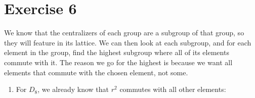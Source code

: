 \documentclass{article}
\begin{document}
    \section*{Exercise 6}
    We know that the centralizers of each group are a subgroup
    of that group,
    so they will feature in its lattice.
    We can then look at each subgroup, and for each element
    in the group, find the highest subgroup where all
    of its elements commute with it.
    The reason we go for the highest is because
    we want all elements that commute with the chosen element, not some.
    \begin{enumerate}[label=\textbf{\alph*.}]
        \item 
            For $D_8$,
            we already know that $r^2$ commutes with all other elements:

            \begin{figure}[H]
                \centering
\end{figure}
\end{enumerate}
\end{document}
